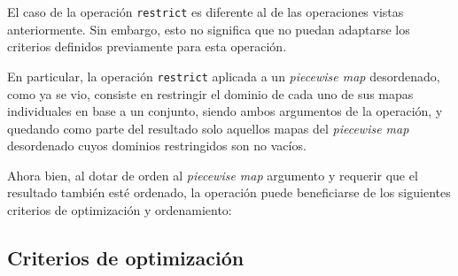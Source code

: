 El caso de la operación \texttt{restrict} es diferente al de las operaciones vistas anteriormente. Sin embargo, esto no significa que no puedan adaptarse los criterios definidos previamente para esta operación.

En particular, la operación \texttt{restrict} aplicada a un \textit{piecewise map} desordenado, como ya se vio, consiste en restringir el dominio de cada uno de sus mapas individuales en base a un conjunto, siendo ambos argumentos de la operación, y quedando como parte del resultado solo aquellos mapas del \textit{piecewise map} desordenado cuyos dominios restringidos son no vacíos.

Ahora bien, al dotar de orden al \textit{piecewise map} argumento y requerir que el resultado también esté ordenado, la operación puede beneficiarse de los siguientes criterios de optimización y ordenamiento:

\subsection{Criterios de optimización}


\begin{center}
\end{center}


